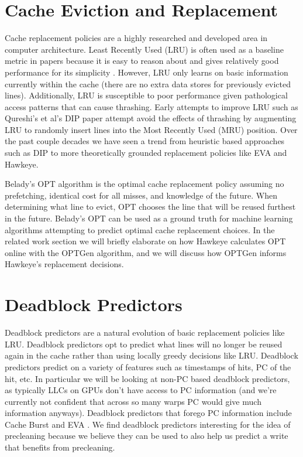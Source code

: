 \section{Cache Eviction and Replacement}
Cache replacement policies are a highly researched and developed area in computer architecture. Least Recently Used (LRU) is often used as a baseline metric in papers because it is easy to reason about and gives relatively good performance for its simplicity \cite{lruperf}. However, LRU only learns on basic information currently within the cache (there are no extra data stores for previously evicted lines). Additionally, LRU is susceptible to poor performance given pathological access patterns that can cause thrashing. Early attempts to improve LRU such as Qureshi’s et al’s DIP paper \cite{dip} attempt avoid the effects of thrashing by augmenting LRU to randomly insert lines into the Most Recently Used (MRU) position. Over the past couple decades we have seen a trend from heuristic based approaches such as DIP to more theoretically grounded replacement policies like EVA \cite{eva} and Hawkeye.

Belady’s OPT algorithm \cite{belady_opt} is the optimal cache replacement policy assuming no prefetching, identical cost for all misses, and knowledge of the future. When determining what line to evict, OPT chooses the line that will be reused furthest in the future. Belady’s OPT can be used as a ground truth for machine learning algorithms attempting to predict optimal cache replacement choices. In the related work section we will briefly elaborate on how Hawkeye calculates OPT online with the OPTGen algorithm, and we will discuss how OPTGen informs Hawkeye’s replacement decisions.

\section{Deadblock Predictors}
Deadblock predictors \cite{deadblock} are a natural evolution of basic replacement policies like LRU. Deadblock predictors opt to predict what lines will no longer be reused again in the cache rather than using locally greedy decisions like LRU. Deadblock predictors predict on a variety of features such as timestamps of hits, PC of the hit, etc. In particular we will be looking at non-PC based deadblock predictors, as typically LLCs on GPUs don’t have access to PC information (and we’re currently not confident that across so many warps PC would give much information anyways). Deadblock predictors that forego PC information include Cache Burst \cite{cache_burst} and EVA \cite{eva}. We find deadblock predictors interesting for the idea of precleaning because we believe they can be used to also help us predict a write that benefits from precleaning.
